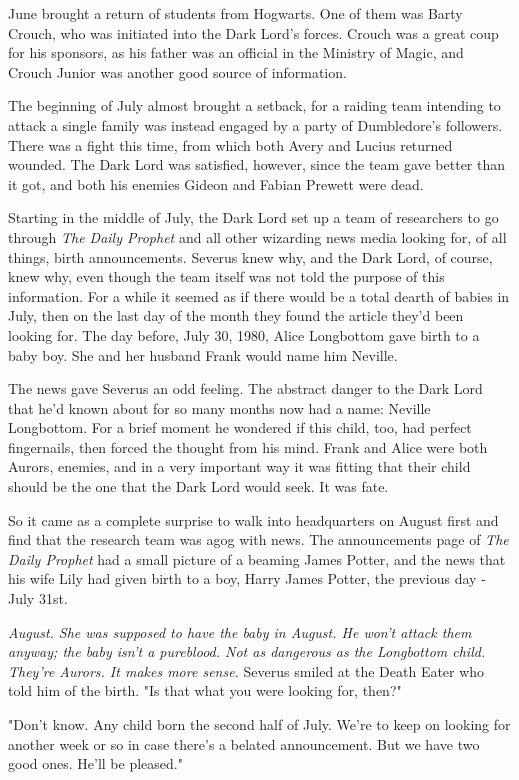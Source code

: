 \documentclass[a4paper,11pt]{article}
\begin{document}
June brought a return of students from Hogwarts. One of them was Barty Crouch, who was initiated into the Dark Lord's forces. Crouch was a great coup for his sponsors, as his father was an official in the Ministry of Magic, and Crouch Junior was another good source of information.

The beginning of July almost brought a setback, for a raiding team intending to attack a single family was instead engaged by a party of Dumbledore's followers. There was a fight this time, from which both Avery and Lucius returned wounded. The Dark Lord was satisfied, however, since the team gave better than it got, and both his enemies Gideon and Fabian Prewett were dead.

Starting in the middle of July, the Dark Lord set up a team of researchers to go through \emph{The Daily Prophet} and all other wizarding news media looking for, of all things, birth announcements. Severus knew why, and the Dark Lord, of course, knew why, even though the team itself was not told the purpose of this information. For a while it seemed as if there would be a total dearth of babies in July, then on the last day of the month they found the article they'd been looking for. The day before, July 30, 1980, Alice Longbottom gave birth to a baby boy. She and her husband Frank would name him Neville.

The news gave Severus an odd feeling. The abstract danger to the Dark Lord that he'd known about for so many months now had a name: Neville Longbottom. For a brief moment he wondered if this child, too, had perfect fingernails, then forced the thought from his mind. Frank and Alice were both Aurors, enemies, and in a very important way it was fitting that their child should be the one that the Dark Lord would seek. It was fate.

So it came as a complete surprise to walk into headquarters on August first and find that the research team was agog with news. The announcements page of \emph{The Daily Prophet} had a small picture of a beaming James Potter, and the news that his wife Lily had given birth to a boy, Harry James Potter, the previous day - July 31st.

\emph{August. She was supposed to have the baby in August. He won't attack them anyway; the baby isn't a pureblood. Not as dangerous as the Longbottom child. They're Aurors. It makes more sense.} Severus smiled at the Death Eater who told him of the birth. "Is that what you were looking for, then?"

"Don't know. Any child born the second half of July. We're to keep on looking for another week or so in case there's a belated announcement. But we have two good ones. He'll be pleased."
\end{document}
